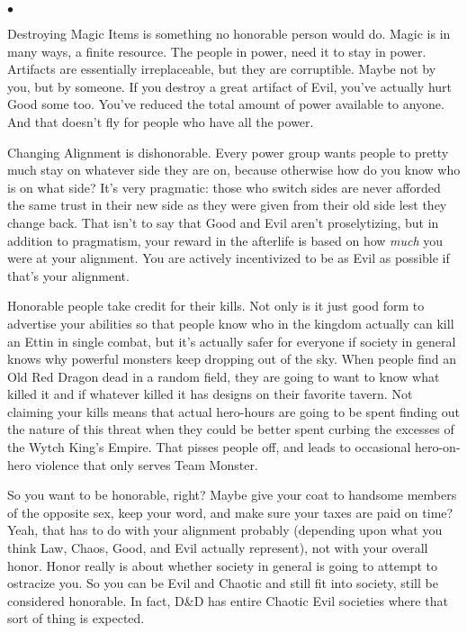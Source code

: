 \begin{list}{$\bullet$}{\itemspace}
    \item Destroying Magic Items is something no honorable person would do. Magic is in many ways, a finite resource. The people in power, need it to stay in power. Artifacts are essentially irreplaceable, but they are corruptible. Maybe not by you, but by someone. If you destroy a great artifact of Evil, you've actually hurt Good some too. You've reduced the total amount of power available to anyone. And that doesn't fly for people who have all the power.
    \item Changing Alignment is dishonorable. Every power group wants people to pretty much stay on whatever side they are on, because otherwise how do you know who is on what side? It's very pragmatic: those who switch sides are never afforded the same trust in their new side as they were given from their old side lest they change back. That isn't to say that Good and Evil aren't proselytizing, but in addition to pragmatism, your reward in the afterlife is based on how \emph{much} you were at your alignment. You are actively incentivized to be as Evil as possible if that's your alignment.
    \item Honorable people take credit for their kills. Not only is it just good form to advertise your abilities so that people know who in the kingdom actually can kill an Ettin in single combat, but it's actually safer for everyone if society in general knows why powerful monsters keep dropping out of the sky. When people find an Old Red Dragon dead in a random field, they are going to want to know what killed it and if whatever killed it has designs on their favorite tavern. Not claiming your kills means that actual hero-hours are going to be spent finding out the nature of this threat when they could be better spent curbing the excesses of the Wytch King's Empire. That pisses people off, and leads to occasional hero-on-hero violence that only serves Team Monster.
\end{list}

\vspace{8pt}
So you want to be honorable, right? Maybe give your coat to handsome members of the opposite sex, keep your word, and make sure your taxes are paid on time? Yeah, that has to do with your alignment probably (depending upon what you think Law, Chaos, Good, and Evil actually represent), not with your overall honor. Honor really is about whether society in general is going to attempt to ostracize you. So you can be Evil and Chaotic and still fit into society, still be considered honorable. In fact, D\&D has entire Chaotic Evil societies where that sort of thing is expected.
